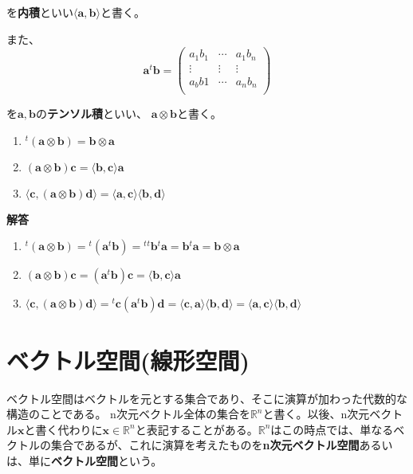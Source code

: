 \documentclass[dvipdfmx,autodetect-engine]{jsarticle}
\newcommand{\innerProduct}[2]{\langle \bm{#1}, \bm{#2} \rangle}
\newcommand{\tensorProduct}[2]{\bm{#1} \otimes \bm{#2}}
\newcommand{\vecSpace}[1]{\mathbb{R}^{#1}}
\begin{document}
を{\bf 内積}といい$\langle \bm{a}, \bm{b} \rangle$と書く。

また、
$$
\bm{a}{}^t\!\bm{b} = \begin{pmatrix}
a_1b_1 & \cdots & a_1b_n \\
\vdots & \vdots & \vdots \\
a_bb1 & \cdots & a_nb_n \\
\end{pmatrix}
$$

を$\bm{a}, \bm{b}$の{\bf テンソル積}といい、 $\bm{a} \otimes \bm{b}$と書く。


\begin{enumerate}
\renewcommand{\labelenumi}{(\arabic{enumi})}
\item ${}^t(\tensorProduct{a}{b}) = \tensorProduct{b}{a}$
\item $(\tensorProduct{a}{b})\bm{c} = \innerProduct{b}{c}\bm{a}$
\item $\innerProduct{c}{(\tensorProduct{a}{b})\bm{d}} = \innerProduct{a}{c}\innerProduct{b}{d}$
\end{enumerate}

{\bf 解答}

\begin{enumerate}
\renewcommand{\labelenumi}{(\arabic{enumi})}
\item ${}^t(\tensorProduct{a}{b}) = {}^t(\bm{a}{}^t\bm{b}) = {}^t{}^t\bm{b}{}^t\bm{a} = \bm{b}{}^t\bm{a} = \tensorProduct{b}{a}$
\item $(\tensorProduct{a}{b})\bm{c} = (\bm{a}{}^t\bm{b})\bm{c} = \innerProduct{b}{c}\bm{a}$
\item $\innerProduct{c}{(\tensorProduct{a}{b})\bm{d}} = {}^t\bm{c}(\bm{a}{}^t\bm{b})\bm{d} = \innerProduct{c}{a}\innerProduct{b}{d} = \innerProduct{a}{c}\innerProduct{b}{d}$
\end{enumerate}


\section{ベクトル空間(線形空間)}

ベクトル空間はベクトルを元とする集合であり、そこに演算が加わった代数的な構造のことである。
n次元ベクトル全体の集合を$\vecSpace{n}$と書く。以後、n次元ベクトル$\bm{x}$と書く代わりに$\bm{x} \in \vecSpace{n}$と表記することがある。$\vecSpace{n}$はこの時点では、単なるベクトルの集合であるが、これに演算を考えたものを{\bf n次元ベクトル空間}あるいは、単に{\bf ベクトル空間}という。
\end{document}
